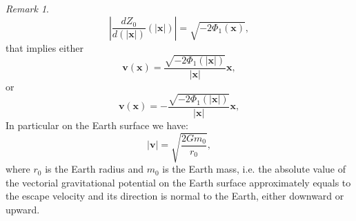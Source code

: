 \documentclass{article}
\theoremstyle{definition}
\theoremstyle{remark}
\newtheorem{remark}{Remark}[section]
\renewcommand{\vec}[1]{\mathbf{#1}}
\newtheorem{remark}{Remark}
\begin{document}
\begin{remark}
\begin{equation}
\left|\frac{dZ_0}{d(|\vec x|)}(|\vec x|)\right|= \sqrt{-2\Phi_1(\vec
x)},
\end{equation}
that implies either
\begin{equation}
\label{MaxVacFull1ninshtrgravortghhghgjkgghklhjgkghghjjkjhjkkggjkhjkhjjhhfhjhklkhkhjjklzzzyyyhjggjhgghhjhNWNWBWHWPPN222kkkgtytghjjhpoppkkkhhhkhjhj}
\vec v(\vec x)= \frac{\sqrt{-2\Phi_1(|\vec x|)}}{|\vec x|}\vec x,
\end{equation}
or
\begin{equation}
\label{MaxVacFull1ninshtrgravortghhghgjkgghklhjgkghghjjkjhjkkggjkhjkhjjhhfhjhklkhkhjjklzzzyyyhjggjhgghhjhNWNWBWHWPPN222kkkgtytghjjhpoppkkkhhhkhjhjiuu}
\vec v(\vec x)= -\frac{\sqrt{-2\Phi_1(|\vec x|)}}{|\vec x|}\vec x,
\end{equation}
In particular on the Earth surface we have:
\begin{equation}
\label{MaxVacFull1ninshtrgravortghhghgjkgghklhjgkghghjjkjhjkkggjkhjkhjjhhfhjhklkhkhjjklzzzyyyhjggjhgghhjhNWNWBWHWPPN222kkkgtytghjjhpoppkkkhhhkhjhjiuuokokok}
|\vec v|=\sqrt{\frac{2Gm_0}{r_0}},
\end{equation}
where $r_0$ is the Earth radius and $m_0$ is the Earth mass, i.e.
the absolute value of the vectorial gravitational potential on the
Earth surface approximately equals to the escape velocity and its
direction is normal to the Earth, either downward or upward.
\end{remark}
\end{document}
